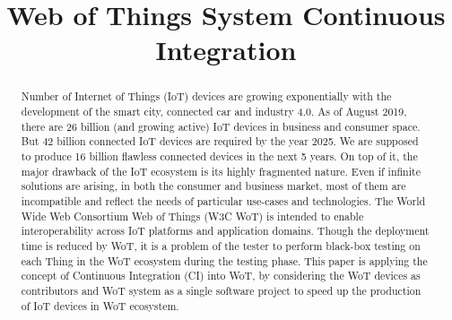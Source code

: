 \documentclass[conference]{IEEEtran}
\theoremstyle{definition}
\begin{document}
\title{Web of Things System Continuous Integration \\
}

\author{
  \and
  \and
}

\maketitle
 


\begin{abstract}

  Number of Internet of Things (IoT) devices are growing exponentially with the development of the smart city, connected car and industry 4.0.
  As of August 2019, there are 26 billion (and growing active) IoT devices in business and consumer space. 
  But 42 billion connected IoT devices are required by the year 2025. 
  We are supposed to produce 16 billion flawless connected devices in the next 5 years. 
  On top of it, the major drawback of the IoT ecosystem is its highly fragmented nature. 
  Even if infinite solutions are arising, in both the consumer and business market, most of them are incompatible and reflect the needs of particular use-cases and technologies. 
  The World Wide Web Consortium Web of Things (W3C WoT) is intended to enable interoperability across IoT platforms and application domains. 
  Though the deployment time is reduced by WoT, it is a problem of the tester to perform black-box testing on each Thing in the WoT ecosystem during the testing phase.  
  This paper is applying the concept of Continuous Integration (CI) into WoT, by considering the WoT devices as contributors and WoT system as a single software project to speed up the production of IoT devices in WoT ecosystem.

\end{abstract}
\end{document}
